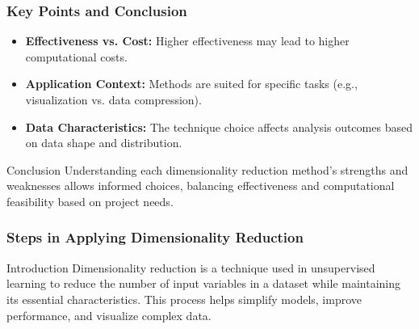 \documentclass[aspectratio=169]{beamer}
\begin{document}
\begin{frame}[fragile]
    \frametitle{Key Points and Conclusion}
    \begin{itemize}
        \item \textbf{Effectiveness vs. Cost:} Higher effectiveness may lead to higher computational costs. 
        \item \textbf{Application Context:} Methods are suited for specific tasks (e.g., visualization vs. data compression).
        \item \textbf{Data Characteristics:} The technique choice affects analysis outcomes based on data shape and distribution.
    \end{itemize}
    
    \begin{block}{Conclusion}
        Understanding each dimensionality reduction method's strengths and weaknesses allows informed choices, balancing effectiveness and computational feasibility based on project needs.
    \end{block}
\end{frame}

\begin{frame}[fragile]
    \frametitle{Steps in Applying Dimensionality Reduction}
    
    \begin{block}{Introduction}
        Dimensionality reduction is a technique used in unsupervised learning to reduce the number of input variables in a dataset while maintaining its essential characteristics.
        This process helps simplify models, improve performance, and visualize complex data.
    \end{block}
\end{frame}
\end{document}
